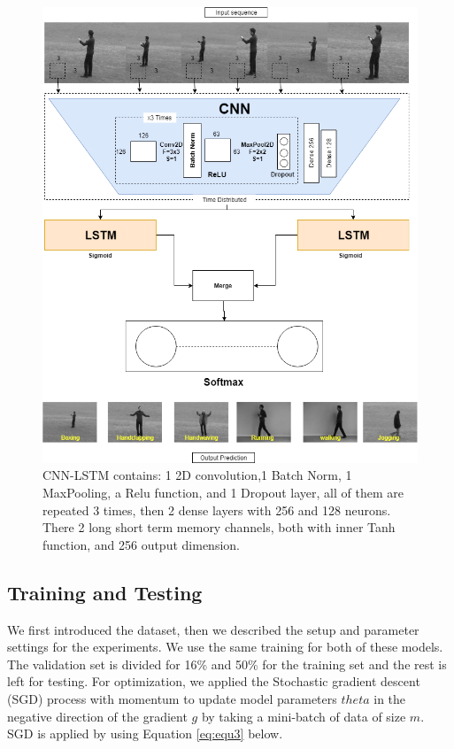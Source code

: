 \documentclass{vldb}
\begin{document}
\begin{figure}[h]
\centering
\includegraphics[width=1.3\columnwidth]{photo/cnnlstm.png}
\caption{CNN-LSTM contains: 1 2D convolution,1 Batch Norm, 1 MaxPooling, a Relu function, and 1 Dropout layer, all of them are repeated 3 times, then 2 dense layers with 256 and 128 neurons. There 2 long  short term memory channels, both with inner Tanh function, and 256 output dimension.}
\label{fig:cnnlstm}
\end{figure}

\subsection{Training and Testing}
We first introduced the dataset, then we described the setup and parameter settings for the experiments. We use the same training for both of these models. The validation set is divided for 16\% and 50\% for the training set and the rest is left for testing.
For optimization, we applied the Stochastic gradient descent (SGD) process with momentum to update model parameters $theta$ in the negative direction of the gradient $g$ by taking a mini-batch of data of size $m$. SGD is applied by using Equation \ref{eq:equ3} below.
\end{document}
